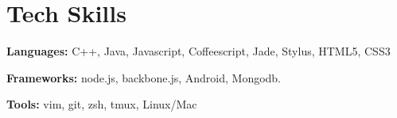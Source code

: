 \section{Tech Skills}
\textbf{Languages:} C++, Java, Javascript, Coffeescript, Jade, Stylus, HTML5, CSS3

\textbf{Frameworks:} node.js, backbone.js, Android, Mongodb.


\textbf{Tools:} vim, git, zsh, tmux, Linux/Mac
